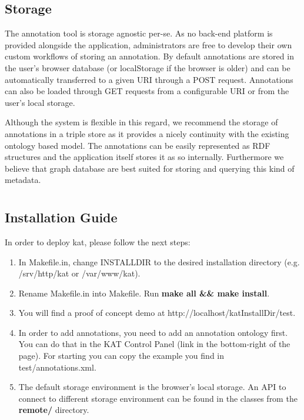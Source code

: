 \documentclass[a4paper, 12pt, notitlepage]{report}
\begin{document}
\section{Storage}
The annotation tool is storage agnostic per-se. As no back-end platform is provided
alongside the application, administrators are free to develop their own custom workflows
of storing an annotation. By default annotations are stored in the user's browser database
(or localStorage if the browser is older) and can be automatically transferred to a given
URI through a POST request. Annotations can also be loaded through GET requests from a
configurable URI or from the user's local storage.

Although the system is flexible in this regard, we recommend the storage of annotations in
a triple store as it provides a nicely continuity with the existing ontology based model.
The annotations can be easily represented as RDF structures and the application itself
stores it as so internally. Furthermore we believe that graph database are best suited for
storing and querying this kind of metadata.
\appendix
\chapter{}

\section{Installation Guide}

In order to deploy kat, please follow the next steps:

\begin{enumerate}
 \item In Makefile.in, change INSTALLDIR to the desired installation directory (e.g. /srv/http/kat or /var/www/kat).
 \item Rename Makefile.in into Makefile. Run \textbf{make all \&\& make install}.
 \item You will find a proof of concept demo at http://localhost/katInstallDir/test.
 \item In order to add annotations, you need to add an annotation ontology first. You can do that in the KAT Control Panel
(link in the bottom-right of the page). For starting you can copy the example you find in test/annotations.xml.
 \item The default storage environment is the browser's local storage. An API to connect to different storage environment
can be found in the classes from the \textbf{remote/} directory.
\end{enumerate}
\end{document}
